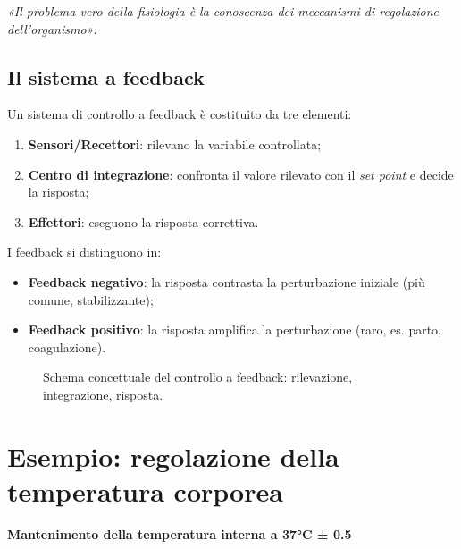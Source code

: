 \documentclass[11pt,a4paper,italian,twoside]{report}
\theoremstyle{definition} %
\begin{document}
\begin{concetto}
\textit{«Il problema vero della fisiologia è la conoscenza dei meccanismi di regolazione dell'organismo»}.
\end{concetto}

\subsection{Il sistema a feedback}
\label{subsec:feedback}

Un sistema di controllo a feedback è costituito da tre elementi:
\begin{enumerate}
  \item \textbf{Sensori/Recettori}: rilevano la variabile controllata;
  \item \textbf{Centro di integrazione}: confronta il valore rilevato con il \textit{set point} e decide la risposta;
  \item \textbf{Effettori}: eseguono la risposta correttiva.
\end{enumerate}

I feedback si distinguono in:
\begin{itemize}
  \item \textbf{Feedback negativo}: la risposta contrasta la perturbazione iniziale (più comune, stabilizzante);
  \item \textbf{Feedback positivo}: la risposta amplifica la perturbazione (raro, es. parto, coagulazione).
\end{itemize}

\begin{figure}[htbp]
  \centering
  \caption{Schema concettuale del controllo a feedback: rilevazione, integrazione, risposta.}
  \label{fig:feedback_schema}
\end{figure}

\section{Esempio: regolazione della temperatura corporea}
\label{sec:termoregolazione}

\begin{esempio}
\textbf{Mantenimento della temperatura interna a 37°C ± 0.5}
\end{esempio}
\end{document}
